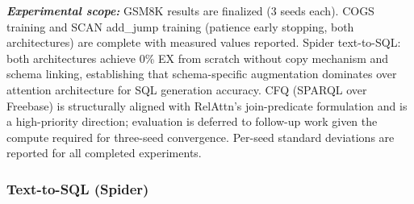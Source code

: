 \documentclass[conference]{IEEEtran}
\begin{document}
\textit{\textbf{Experimental scope:}} GSM8K results are finalized (3 seeds each). COGS training and SCAN add\_jump training (patience early stopping, both architectures) are complete with measured values reported. Spider text-to-SQL: both architectures achieve 0\% EX from scratch without copy mechanism and schema linking, establishing that schema-specific augmentation dominates over attention architecture for SQL generation accuracy. CFQ (SPARQL over Freebase) is structurally aligned with RelAttn's join-predicate formulation and is a high-priority direction; evaluation is deferred to follow-up work given the compute required for three-seed convergence. Per-seed standard deviations are reported for all completed experiments.

\subsubsection{Text-to-SQL (Spider)}

\begin{table}[t]
\centering
\caption{Text-to-SQL on Spider dev. EX~=~execution accuracy; EM~=~exact match. \emph{From-scratch rows ($^\S$): both architectures achieve 0\% EX without copy mechanism / schema linking; schema-specific augmentation is required for nonzero SQL generation accuracy from scratch.} $^{\#\#}$\emph{Mechanism-isolation ablation only}: greedy, db-name-only, 25 fine-tuning epochs. Pretrained rows are context only.}
\label{tab:spider}
\end{table}
\end{document}
